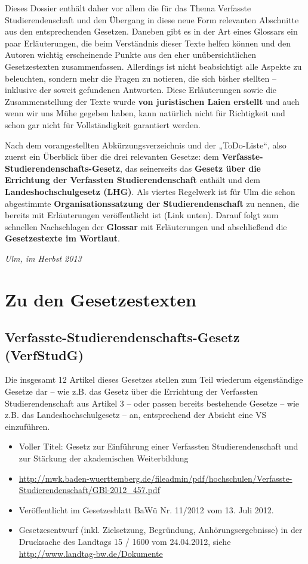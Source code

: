 \documentclass[
10pt,
a4paper,
twoside,								%
titlepage=false,							%
draft=false								%
]{scrartcl}
\begin{document}
Dieses Dossier enthält daher vor allem die für das Thema Verfasste Studierendenschaft und den Übergang in diese neue Form relevanten Abschnitte aus den entsprechenden Gesetzen. Daneben gibt es in der Art eines Glossars ein paar Erläuterungen, die beim Verständnis dieser Texte helfen können und den Autoren wichtig erscheinende Punkte aus den eher unübersichtlichen Gesetzestexten zusammenfassen. Allerdings ist nicht beabsichtigt alle Aspekte zu beleuchten, sondern mehr die Fragen zu notieren, die sich bisher stellten – inklusive der soweit gefundenen Antworten. Diese Erläuterungen sowie die Zusammenstellung der Texte wurde \textbf{von juristischen Laien erstellt} und auch wenn wir uns Mühe gegeben haben, kann natürlich nicht für Richtigkeit und schon gar nicht für Vollständigkeit garantiert werden.

Nach dem vorangestellten Abkürzungsverzeichnis und der „ToDo-Liste“, also zuerst ein Überblick über die drei relevanten Gesetze: dem \textbf{Verfasste-Studierendenschafts-Gesetz}, das seinerseits das \textbf{Gesetz über die Errichtung der Verfassten Studierendenschaft} enthält und dem \textbf{Landeshochschulgesetz (LHG)}. Als viertes Regelwerk ist für Ulm die schon abgestimmte \textbf{Organisationssatzung der Studierendenschaft} zu nennen, die bereits mit Erläuterungen veröffentlicht ist (Link unten). Darauf folgt zum schnellen Nachschlagen der \textbf{Glossar} mit Erläuterungen und abschließend die \textbf{Gesetzestexte im Wortlaut}.

\begin{flushright}
	\textit{Ulm, im Herbst 2013}
\end{flushright}



\newpage
\section{Zu den Gesetzestexten}
\subsection{Verfasste-Studierendenschafts-Gesetz (VerfStudG)}

Die insgesamt 12 Artikel dieses Gesetzes stellen zum Teil wiederum eigenständige Gesetze dar – wie z.B. das Gesetz über die Errichtung der Verfassten Studierendenschaft aus Artikel 3 – oder passen bereits bestehende Gesetze – wie z.B. das Landeshochschulgesetz – an, entsprechend der Absicht eine VS einzuführen.

\begin{itemize}
	\item Voller Titel: Gesetz zur Einführung einer Verfassten Studierendenschaft und zur Stärkung der akademischen Weiterbildung
	\item \sloppy \url{http://mwk.baden-wuerttemberg.de/fileadmin/pdf/hochschulen/Verfasste-Studierendenschaft/GBl-2012_457.pdf}
	\item Veröffentlicht im Gesetzesblatt BaWü Nr. 11/2012 vom 13. Juli 2012.
	\item Gesetzesentwurf (inkl. Zielsetzung, Begründung, Anhörungsergebnisse) in der Drucksache des Landtags 15 / 1600 vom 24.04.2012, siehe \url{http://www.landtag-bw.de/Dokumente}
\end{itemize}
\end{document}
